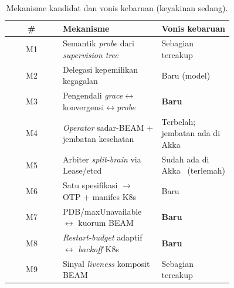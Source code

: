 \begin{table}[H]
  \centering\small
  \begin{tabular}{@{}cp{0.44\linewidth}p{0.32\linewidth}@{}}
    \toprule
    \# & Mekanisme & Vonis kebaruan \\
    \midrule
    M1 & Semantik \emph{probe} dari \emph{supervision tree} & Sebagian tercakup~\cite{roberts2025} \\
    M2 & Delegasi kepemilikan kegagalan & Baru (model)~\cite{elnozahy2002,ucc23} \\
    M3 & Pengendali \emph{grace}$\leftrightarrow$konvergensi$\leftrightarrow$\emph{probe} & \textbf{Baru} \\
    M4 & \emph{Operator} sadar-BEAM + jembatan kesehatan & Terbelah; jembatan ada di Akka~\cite{akkaHealth} \\
    M5 & Arbiter \emph{split-brain} via Lease/etcd & Sudah ada di Akka~\cite{akkaLease} (terlemah) \\
    M6 & Satu spesifikasi $\rightarrow$ OTP + manifes K8s & Baru~\cite{ucc23} \\
    M7 & PDB/maxUnavailable $\leftrightarrow$ kuorum BEAM & \textbf{Baru}~\cite{k8sPDB} \\
    M8 & \emph{Restart-budget} adaptif $\leftrightarrow$ \emph{backoff} K8s & \textbf{Baru}~\cite{kephart2003} \\
    M9 & Sinyal \emph{liveness} komposit BEAM & Sebagian tercakup~\cite{roberts2025} \\
    \bottomrule
  \end{tabular}
  \caption{Mekanisme kandidat dan vonis kebaruan (keyakinan sedang).}
  \label{tab:verdicts}
\end{table}

